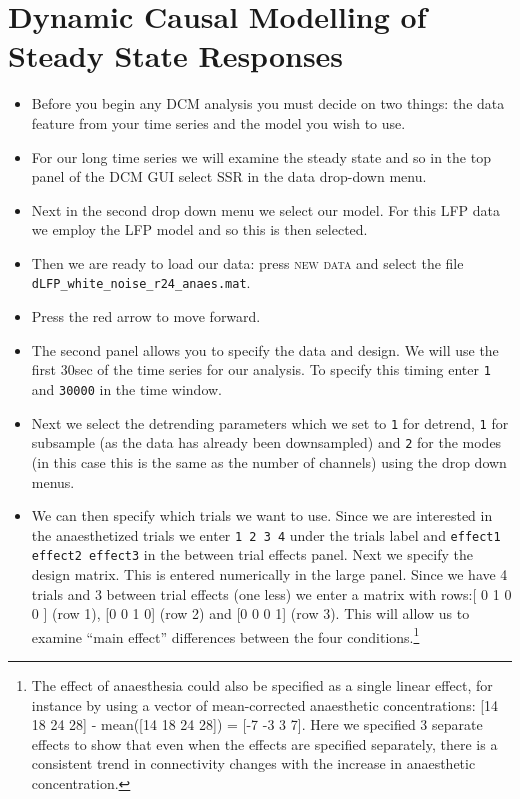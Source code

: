 \section{Dynamic Causal Modelling of Steady State Responses}

\begin{itemize}
\item Before you begin any DCM analysis you must decide on two things: the data feature from your time series and the model you wish to use.
\item For our long time series we will examine the steady state and so in the top panel of the DCM GUI select \textsc{SSR} in the data drop-down menu.
\item Next in the second drop down menu we select our model. For this LFP data we employ the \textsc{LFP} model and so this is then selected. 
\item Then we are ready to load our data: press \textsc{new data} and select the file \texttt{dLFP\_white\_noise\_r24\_anaes.mat}.
\item Press the red arrow to move forward.
\item The second panel allows you to specify the data and design. We will use the first 30sec of the time series for our analysis. To specify this timing enter \texttt{1} and \texttt{30000} in the time window.
\item Next we select the detrending parameters which we set to \texttt{1} for detrend, \texttt{1} for subsample (as the data has already been downsampled) and \texttt{2} for the modes (in this case this is the same as the number of channels) using the drop down menus.
\item We can then specify which trials we want to use. Since we are interested in the anaesthetized trials we enter \texttt{1 2 3 4} under the trials label and \texttt{effect1 effect2 effect3} in the between trial effects panel. Next we specify the design matrix. This is entered numerically in the large panel. Since we have 4 trials and 3 between trial effects (one less) we enter a matrix with rows:[ 0 1 0 0 ] (row 1), [0 0 1 0] (row 2) and [0 0 0 1] (row 3). This will allow us to examine ``main effect'' differences between the four conditions.\footnote{The effect of anaesthesia could also be specified as a single linear effect, for instance by using a vector of mean-corrected anaesthetic concentrations: [14 18 24 28] - mean([14 18 24 28]) = [-7 -3 3 7]. Here we specified 3 separate effects to show that even when the effects are specified separately, there is a consistent trend in connectivity changes with the increase in anaesthetic concentration.}

\end{itemize}
